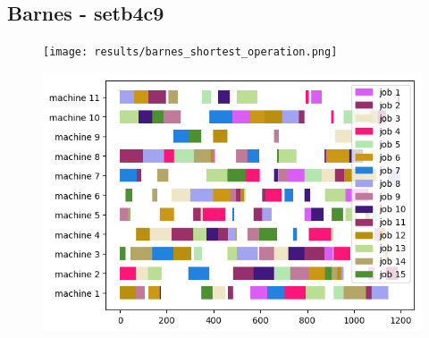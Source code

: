 \subsection{Barnes - setb4c9}

\begin{figure}[!h]
    \centering
    \texttt{[image: results/barnes\_shortest\_operation.png]}
\end{figure}

\begin{figure}[!h]
    \centering
    \includegraphics[]{results/barnes_setb4c9_genetic.png}
\end{figure}

